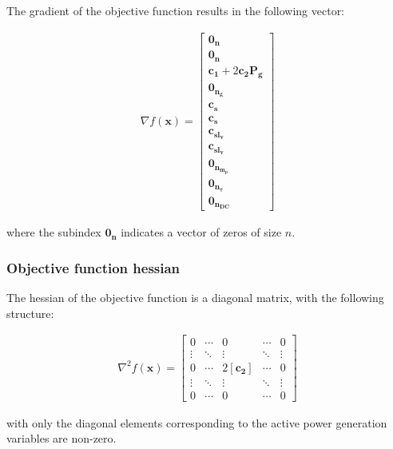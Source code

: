 The gradient of the objective function results in the following vector:

\begin{equation}
    \begin{split}
        \nabla f(\bm{x}) = \begin{bmatrix}
            \bm{0_n}\\
            \bm{0_n}\\
            \bm{c_{1}} + 2\bm{c_{2}}\bm{P_g}\\
            \bm{0_{n_g}}\\
            \bm{c_{s}}\\
            \bm{c_{s}}\\
            \bm{c_{sl_v}}\\
            \bm{c_{sl_v}}\\
            \bm{0_{n_{m_p}}}\\
            \bm{0_{n_{\tau}}}\\
            \bm{0_{n_{DC}}}
        \end{bmatrix}
    \end{split}
\end{equation}

where the subindex $\bm{0_{n}}$ indicates a vector of zeros of size $n$. 

\subsubsection{Objective function hessian}

The hessian of the objective function is a diagonal matrix, with the following structure:

\begin{equation}
    \begin{split}
        \nabla^{2} f(\bm{x}) = \begin{bmatrix}
            0 & \cdots & 0 & \cdots & 0\\
        \vdots & \ddots & \vdots & \ddots & \vdots\\
        0 & \cdots & 2[\bm{c_{2}}] & \cdots & 0\\
        \vdots & \ddots & \vdots & \ddots & \vdots\\
        0 & \cdots & 0 & \cdots & 0
        \end{bmatrix}
    \end{split}
\end{equation}

with only the diagonal elements corresponding to the active power generation variables are non-zero.            


